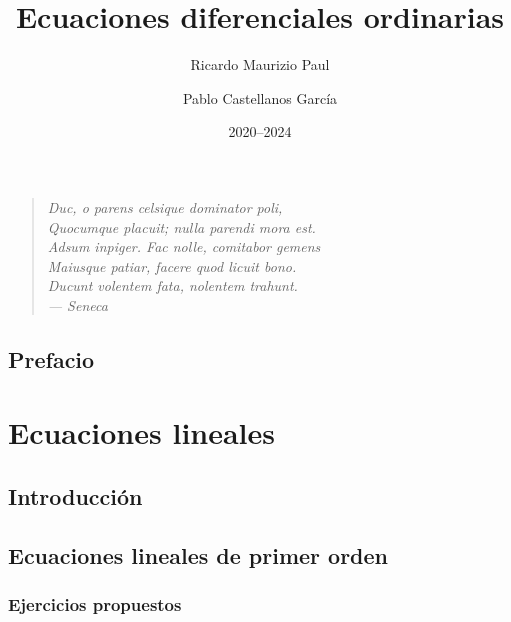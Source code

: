 \documentclass[a4paper, 10pt, openany]{book}
\title{Ecuaciones diferenciales ordinarias}
\author{Ricardo Maurizio Paul \and Pablo Castellanos García}
\date{2020--2024}
\makeatletter
\renewcommand\mainmatter{
    \@mainmattertrue\cleardoublepage\renewcommand\thepage{\arabic{page}}}
\makeatother
\begin{document}
\frontmatter{}

\maketitle

\clearpage
\vspace*{\fill}
\thispagestyle{empty} %
\begin{quotation}
	\raggedleft{}
	\em %
	Duc, o parens celsique dominator poli, \\
	Quocumque placuit; nulla parendi mora est. \\
	Adsum inpiger. Fac nolle, comitabor gemens \\
	Maiusque patiar, facere quod licuit bono. \\
	Ducunt volentem fata, nolentem trahunt. \\
	\bigskip
	--- Seneca
\end{quotation}
\vspace*{\fill}

\tableofcontents

\chapter{Prefacio}


\mainmatter{}


\part{Ecuaciones lineales}

\chapter{Introducción}\label{CHAP:INTRO}


\chapter{Ecuaciones lineales de primer orden}\label{CHAP:EC_LINEAL_PRIMER_ORDEN}

\newpage
\section{Ejercicios propuestos}

\end{document}
